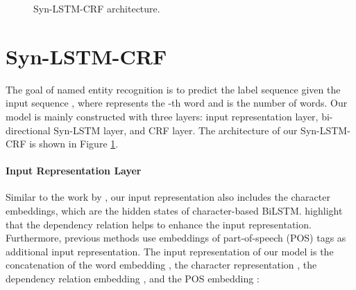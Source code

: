\documentclass[11pt]{article}
\begin{document}
\begin{figure}[t!]
{ 
		}
\caption{Syn-LSTM-CRF architecture. 
}
\label{fig:archi}
	\end{figure}

\section{Syn-LSTM-CRF}
The goal of named entity recognition is to predict the label sequence   given the input sequence , where   represents the -th word and  is the number of words. 
Our model is mainly constructed with three layers: input representation layer, bi-directional Syn-LSTM layer, and CRF layer. 
The architecture of our Syn-LSTM-CRF is shown in Figure \ref{fig:archi}.

\paragraph{Input Representation Layer}
Similar to the work by \citet{lample2016neural}, our input representation also includes the character embeddings, which are the hidden states of character-based BiLSTM. \citet{Jie2019DependencyGuidedLF} highlight that the dependency relation helps to enhance the input representation.
Furthermore, previous methods \cite{wang2018nner, wang2018oner} use embeddings of part-of-speech (POS) tags as additional input representation. The input representation  of our model is the concatenation of the word embedding , the character representation , the dependency relation embedding , and the POS embedding :
\end{document}
